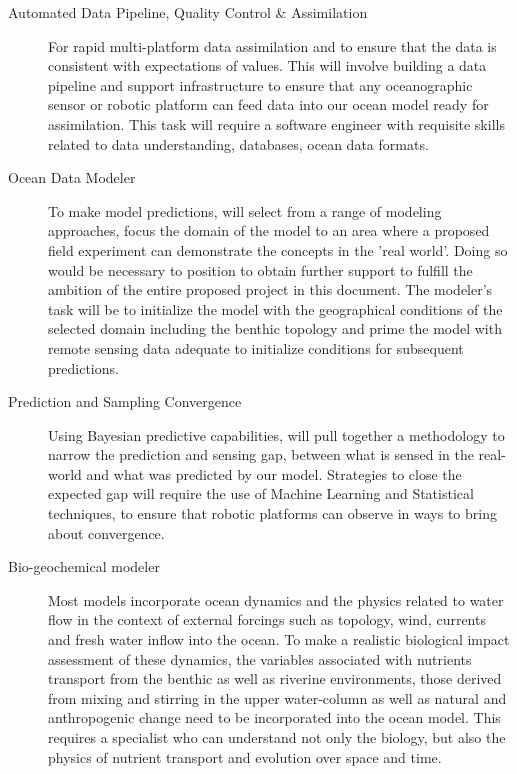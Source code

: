 \begin{description}

\item[Automated Data Pipeline, Quality Control \& Assimilation] For
  rapid multi-platform data assimilation and to ensure that the data is
  consistent with expectations of values. This will involve building a
  data pipeline and support infrastructure to ensure that any
  oceanographic sensor or robotic platform can feed data into our ocean
  model ready for assimilation. This task will require a software
  engineer with requisite skills related to data understanding,
  databases, ocean data formats.

\item[Ocean Data Modeler] To make model predictions, \pro will select
  from a range of modeling approaches, focus the domain of the model to
  an area where a proposed field experiment can demonstrate the concepts
  in the 'real world'. Doing so would be necessary to position \pro to
  obtain further support to fulfill the ambition of the entire proposed
  project in this document. The modeler's task will be to initialize the
  model with the geographical conditions of the selected domain
  including the benthic topology and prime the model with remote sensing
  data adequate to initialize conditions for subsequent predictions. 

\item[Prediction and Sampling Convergence] Using Bayesian predictive
  capabilities, \pro will pull together a methodology to narrow the
  prediction and sensing gap, between what is sensed in the real-world
  and what was predicted by our model. Strategies to close the expected
  gap will require the use of Machine Learning and Statistical
  techniques, to ensure that robotic platforms can observe in ways to
  bring about convergence. 

\item[Bio-geochemical modeler] Most models incorporate ocean dynamics
  and the physics related to water flow in the context of external
  forcings such as topology, wind, currents and fresh water inflow into
  the ocean. To make a realistic biological impact assessment of these
  dynamics, the variables associated with nutrients transport from the
  benthic as well as riverine environments, those derived from mixing
  and stirring in the upper water-column as well as natural and
  anthropogenic change need to be incorporated into the ocean
  model. This requires a specialist who can understand not only the
  biology, but also the physics of nutrient transport and evolution over
  space and time.


\end{description}

